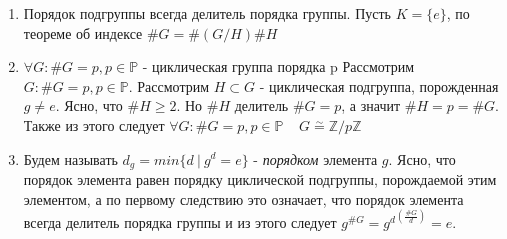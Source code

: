 \begin{enumerate}
  \item Порядок подгруппы всегда делитель порядка группы. \newline
    Пусть $ K = \{e\} $, по теореме об индексе $ \#G = \#(G/H)\#H $
  \item $ \forall G : \#G = p, p \in \mathbb{P} $ - циклическая группа порядка p \newline
    Рассмотрим $ G : \#G = p, p \in \mathbb{P} $. Рассмотрим $ H \subset G $ - циклическая подгруппа,
    порожденная $ g \ne e $. Ясно, что $ \#H \ge 2 $. Но $ \#H $ делитель $ \#G = p $, а значит
    $ \#H = p = \# G $. Также из этого следует $ \forall G : \#G = p, p \in \mathbb{P} \;\;\;\; 
    G \overset\sim{=} \mathbb{Z}/p\mathbb{Z} $
  \item Будем называть $ d_g = min \{ d ~ | ~ g^d = e \} $ - \emph{порядком} элемента $ g $. 
    Ясно, что порядок элемента равен порядку циклической подгруппы, порождаемой этим элементом, а по первому
    следствию это означает, что порядок элемента всегда делитель порядка группы и из этого следует $ g^{\#G} = {g^{d}}^{(\frac{\#G}{d})} = e $. 
\end{enumerate}
